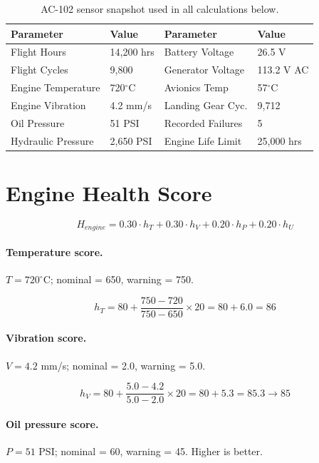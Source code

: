 \documentclass[11pt, a4paper]{report}
\begin{document}
\begin{table}[h!]
\centering
\begin{tabular}{@{}llll@{}}
\toprule
\textbf{Parameter}  & \textbf{Value} & \textbf{Parameter} & \textbf{Value} \\
\midrule
Flight Hours        & 14,200 hrs     & Battery Voltage    & 26.5 V \\
Flight Cycles       & 9,800          & Generator Voltage  & 113.2 V AC \\
Engine Temperature  & 720$^\circ$C   & Avionics Temp      & 57$^\circ$C \\
Engine Vibration    & 4.2 mm/s       & Landing Gear Cyc.  & 9,712 \\
Oil Pressure        & 51 PSI         & Recorded Failures  & 5 \\
Hydraulic Pressure  & 2,650 PSI      & Engine Life Limit  & 25,000 hrs \\
\bottomrule
\end{tabular}
\caption{AC-102 sensor snapshot used in all calculations below.}
\end{table}

\section{Engine Health Score}

\[
H_{engine} = 0.30 \cdot h_T + 0.30 \cdot h_V + 0.20 \cdot h_P + 0.20 \cdot h_U
\]

\paragraph{Temperature score.} $T = 720^\circ$C; nominal = 650, warning = 750.

\[
h_T = 80 + \frac{750 - 720}{750 - 650} \times 20 = 80 + 6.0 = 86
\]

\paragraph{Vibration score.} $V = 4.2$ mm/s; nominal = 2.0, warning = 5.0.

\[
h_V = 80 + \frac{5.0 - 4.2}{5.0 - 2.0} \times 20 = 80 + 5.3 = 85.3 \rightarrow 85
\]

\paragraph{Oil pressure score.} $P = 51$ PSI; nominal = 60, warning = 45. Higher is better.
\end{document}
